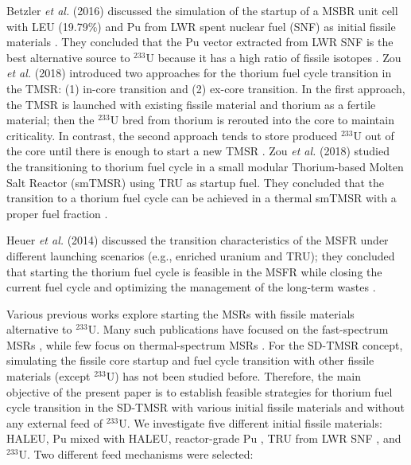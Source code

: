 Betzler \emph{et al.} (2016) discussed the simulation of the startup of a \gls{MSBR} unit
cell with \gls{LEU} (19.79\%) and Pu from \gls{LWR} spent nuclear fuel (SNF) as initial
fissile materials \cite{betzler2016modeling}. They concluded that the 
Pu vector extracted from LWR SNF is the best alternative source to 
$^{233}$U because it has a high ratio of fissile isotopes
\cite{betzler2016modeling}. Zou \emph{et al.} (2018) introduced two approaches for
the thorium fuel cycle transition in the \gls{TMSR}: (1) in-core transition and 
(2) ex-core transition. In the first approach, the TMSR is launched with 
existing fissile material and thorium as a fertile material; then the 
$^{233}$U bred from thorium is rerouted into the core to maintain criticality. 
In contrast, the second approach tends to store produced $^{233}$U out of the 
core until there is enough to start a new TMSR \cite{zou2018transition}.
Zou \emph{et al.} (2018) studied the transitioning to thorium fuel
cycle in a small modular Thorium-based Molten Salt Reactor (smTMSR) using \gls{TRU}
as startup fuel. They concluded that the transition to a thorium fuel cycle can
be achieved in a thermal smTMSR with a proper fuel fraction 
\cite{zou2018preliminary}.

Heuer \emph{et al.} (2014) discussed the transition characteristics of the \gls{MSFR}
under different launching scenarios (e.g., enriched uranium and TRU); they concluded that starting the thorium fuel cycle is feasible in the MSFR while closing the current fuel cycle and optimizing the management of the long-term wastes \cite{heuer2014towards}.

Various previous works explore starting the
\glspl{MSR} with fissile materials alternative to $^{233}$U. Many such publications have focused on the fast-spectrum \glspl{MSR} \cite{heuer2014towards,ashraf2019modeling,
	ashraf2018nuclear, rykhlevskii_fuel_2019, betzler_impacts_2019,
	fiorina2013investigation}, while few focus on
thermal-spectrum \glspl{MSR} \cite{betzler2016modeling,
	zou2018transition,zou2018preliminary}. For the SD-TMSR concept, simulating the fissile core startup and fuel cycle transition with other
fissile materials (except $^{233}$U) has not been studied before. Therefore,
the main objective of the present paper is to establish feasible strategies for thorium fuel cycle transition in the \gls{SD-TMSR} with
various initial fissile materials and without any external feed of $^{233}$U. We investigate five different
initial fissile materials: \gls{HALEU}, Pu mixed with \gls{HALEU}, reactor-grade Pu \cite{marka1993explosive}, \gls{TRU} from LWR SNF \cite{de2000scenarios}, and $^{233}$U. Two different feed mechanisms were selected:

